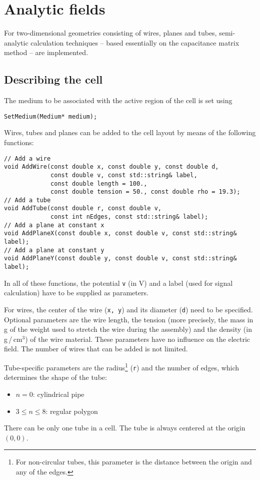 \section{Analytic fields}

For two-dimensional geometries consisting of wires, planes and tubes, 
semi-analytic calculation techniques -- based essentially 
on the capacitance matrix method -- are implemented.

\subsection{Describing the cell}
The medium to be associated with the active region of the cell 
is set using
\begin{lstlisting}
SetMedium(Medium* medium);
\end{lstlisting}
Wires, tubes and planes can be added to the cell layout by means of the 
following functions:
\begin{lstlisting}
// Add a wire
void AddWire(const double x, const double y, const double d,
             const double v, const std::string& label, 
             const double length = 100.,
             const double tension = 50., const double rho = 19.3);
// Add a tube
void AddTube(const double r, const double v, 
             const int nEdges, const std::string& label);
// Add a plane at constant x
void AddPlaneX(const double x, const double v, const std::string& label);
// Add a plane at constant y
void AddPlaneY(const double y, const double v, const std::string& label);

\end{lstlisting} 

In all of these functions, the potential \texttt{v} (in V) 
and a label (used for signal calculation) 
have to be supplied as parameters.
 
For wires, the center of the wire (\texttt{x, y}) 
and its diameter (\texttt{d}) need to be specified. 
Optional parameters are the wire length, the tension (more precisely, the 
mass in g of the weight used to stretch the wire during the assembly) and 
the density (in g\,/\,cm\(^{3}\)) of the wire material. 
These parameters have no influence on the electric field. 
The number of wires that can be added is not limited.

Tube-specific parameters are the radius\footnote{For non-circular tubes, this parameter is the distance between the origin and any of the edges.} (\texttt{r}) and the number of edges, which determines the shape of the tube:
  \begin{itemize}
    \item
    \(n = 0\): cylindrical pipe
    \item
    \(3 \le n \le 8\): regular polygon 
  \end{itemize}
There can be only one tube in a cell. 
The tube is always centered at the origin \(\left(0, 0\right)\).

